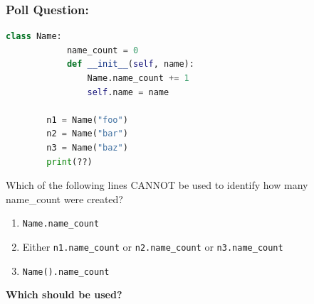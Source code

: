 \documentclass{beamer}
\begin{document}
%
%
%
\begin{frame}[fragile]
    \frametitle{Poll Question: }
    \begin{minipage}{0.49\textwidth}
        \begin{lstlisting}[language=Python, autogobble]
        class Name:
            name_count = 0
            def __init__(self, name):
                Name.name_count += 1
                self.name = name

        n1 = Name("foo")
        n2 = Name("bar")
        n3 = Name("baz")
        print(??)
        \end{lstlisting}
    \end{minipage}
    \hfill
    \begin{minipage}{0.49\textwidth}
        Which of the following lines CANNOT be used to identify how many name_count were created?
        \begin{enumerate}[A]
            \item \lstinline|Name.name_count|
            \item Either \lstinline|n1.name_count| or \lstinline|n2.name_count| or \lstinline|n3.name_count|
            \item \lstinline|Name().name_count|
        \end{enumerate}
    \end{minipage}
    \vfill
    \textbf{Which should be used?}
\end{frame}
\end{document}
